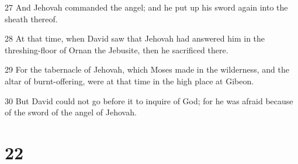 \par 27 And Jehovah commanded the angel; and he put up his sword again into the sheath thereof.
\par 28 At that time, when David saw that Jehovah had answered him in the threshing-floor of Ornan the Jebusite, then he sacrificed there.
\par 29 For the tabernacle of Jehovah, which Moses made in the wilderness, and the altar of burnt-offering, were at that time in the high place at Gibeon.
\par 30 But David could not go before it to inquire of God; for he was afraid because of the sword of the angel of Jehovah.

\chapter{22}

